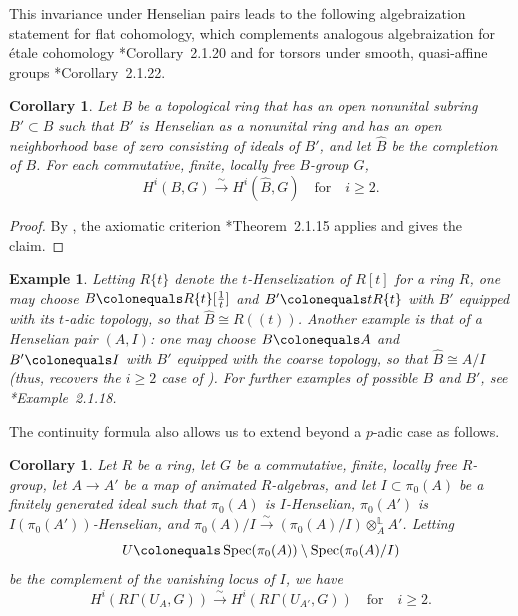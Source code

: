 \documentclass[11pt, reqno]{amsart}
\newcommand{\bL}{\mathbb{L}}
\DeclareMathOperator{\Spec}{Spec}		%
\newcommand{\ce}{\colonequals}
\newcommand{\isomto}{\overset{\sim}{\longrightarrow}}
\newcommand{\llp}{(\!(}			%
\newcommand{\ra}{\rightarrow}
\newcommand{\rrp}{)\!)}			%
\newcommand{\tensor}{\otimes} 			%
\newcommand{\wh}{\widehat}
\providecommand{\up}[1]{{\upshape(}#1{\upshape)}}
\providecommand{\f}[2]{\frac{#1}{#2}}
\newcommand{\beg}{\begin{eg}}
\newcommand{\eeg}{\end{eg}}
\providecommand{\qxq}[1]{\quad\text{#1}\quad}
\providecommand{\qx}[1]{\quad\text{#1}}
\newcommand{\bpf}{\begin{proof}}
\newcommand{\epf}{\end{proof}}
\newcommand{\bcor}{\begin{cor}}
\newcommand{\ecor}{\end{cor}}
\numberwithin{equation}{numberingbase}
\theoremstyle{thms}
\newtheorem{cor}[numberingbase]{Corollary}
\theoremstyle{claims}
\theoremstyle{defs}
\newtheorem{eg}[numberingbase]{Example}
\theoremstyle{thms}
\theoremstyle{defs}
\theoremstyle{subsection-tweak}
\theoremstyle{subsection-tweak}
\begin{document}
This invariance under Henselian pairs leads to the following algebraization statement for flat cohomology, which complements analogous algebraization for \'{e}tale cohomology \cite{BC19}*{Corollary~2.1.20} and for torsors under smooth, quasi-affine groups \cite{BC19}*{Corollary~2.1.22}. 

\bcor \label{cor:algebraization}
Let $B$ be a topological ring that has an open nonunital subring $B' \subset B$ such that $B'$ is Henselian as a nonunital ring and has an open neighborhood base of zero consisting of ideals of $B'$, and let $\wh{B}$ be the completion of $B$. For each commutative, finite, locally free $B$-group $G$, 
\[
H^i(B, G) \isomto H^i(\wh{B}, G) \qxq{for} i \ge 2. 
\]
\ecor


\bpf
By , the axiomatic criterion \cite{BC19}*{Theorem~2.1.15} applies and gives the claim.
\epf



\beg
Letting $R\{t\}$ denote the $t$-Henselization of $R[t]$ for a ring $R$, one may choose $B \ce R\{t\}[\f 1t]$ and $B' \ce tR\{t\}$ with $B'$ equipped with its $t$-adic topology, so that $\wh{B} \cong R\llp t \rrp$. Another example is that of a Henselian pair $(A, I)$: one may choose $B \ce A$ and $B' \ce I$ with $B'$ equipped with the coarse topology, so that $\wh{B} \cong A/I$ (thus,  recovers the $i \ge 2$ case of ). For further examples of possible $B$ and $B'$, see \cite{BC19}*{Example~2.1.18}.
\eeg










The continuity formula also allows us to extend  beyond a $p$-adic case as follows.

\bcor \label{cor:more-algebrization}
Let $R$ be a ring, let $G$ be a commutative, finite, locally free $R$-group, let $A \ra A'$ be a map  of animated $R$-algebras, and let $I \subset \pi_0(A)$ be a finitely generated ideal such that $\pi_0(A)$ is $I$-Henselian, $\pi_0(A')$ is $I(\pi_0(A'))$-Henselian, and $\pi_0(A)/I \isomto (\pi_0(A)/I) \tensor^\bL_A A'$. Letting 
\[
U \ce \Spec(\pi_0(A)) \setminus \Spec(\pi_0(A)/I)
\]
be the complement of the vanishing locus of $I$, we have
\[
H^i(R\Gamma(U_A, G)) \isomto H^i(R\Gamma(U_{A'}, G)) \qxq{for} i \ge 2. %
\]
\ecor
\end{document}
